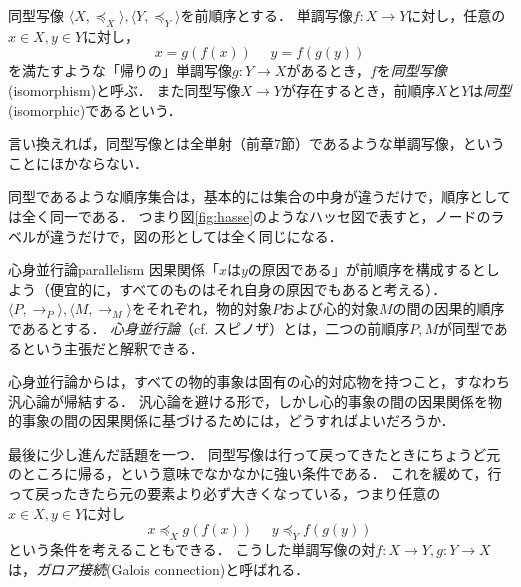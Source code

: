 \documentclass[dvipdfmx,11pt,a4paper]{jsarticle}
\begin{document}
\begin{dfn}{同型写像}{}
$\langle X, \preceq_X \rangle, \langle Y, \preceq_Y \rangle$を前順序とする．
単調写像$f:X \to Y$に対し，任意の$x \in X, y \in Y$に対し，
\[
 x = g(f(x)) \ \ \ \ \ \ y = f(g(y))
\]
を満たすような「帰りの」単調写像$g:Y \to X$があるとき，$f$を\emph{同型写像}(isomorphism)と呼ぶ．
また同型写像$X \to Y$が存在するとき，前順序$X$と$Y$は\emph{同型}(isomorphic)であるという．
\end{dfn}
言い換えれば，同型写像とは全単射（前章7節）であるような単調写像，ということにほかならない．

同型であるような順序集合は，基本的には集合の中身が違うだけで，順序としては全く同一である．
つまり図\ref{fig:hasse}のようなハッセ図で表すと，ノードのラベルが違うだけで，図の形としては全く同じになる．


\begin{rei}{心身並行論}{parallelism}
因果関係「$x$は$y$の原因である」が前順序を構成するとしよう（便宜的に，すべてのものはそれ自身の原因でもあると考える）．
$\langle P, \to_P \rangle, \langle M, \to_M \rangle$をそれぞれ，物的対象$P$および心的対象$M$の間の因果的順序であるとする．
\emph{心身並行論}（cf. スピノザ）とは，二つの前順序$P, M$が同型であるという主張だと解釈できる．
\end{rei}

\begin{hatten}{}{}
心身並行論からは，すべての物的事象は固有の心的対応物を持つこと，すなわち汎心論が帰結する．
汎心論を避ける形で，しかし心的事象の間の因果関係を物的事象の間の因果関係に基づけるためには，どうすればよいだろうか．
\end{hatten}

最後に少し進んだ話題を一つ．
同型写像は行って戻ってきたときにちょうど元のところに帰る，という意味でなかなかに強い条件である．
これを緩めて，行って戻ったきたら元の要素より必ず大きくなっている，つまり任意の$x \in X, y \in Y$に対し
\[
 x \preceq_X g(f(x)) \ \ \ \ \ \ y \preceq_Y f(g(y))
\]
という条件を考えることもできる．
こうした単調写像の対$f:X \to Y, g:Y \to X$は，\emph{ガロア接続}(Galois connection)と呼ばれる．
\end{document}
